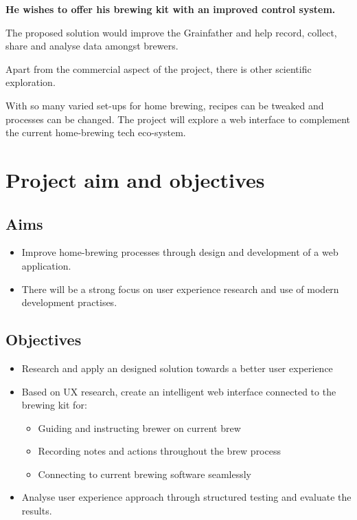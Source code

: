\textbf{He wishes to offer his brewing kit with an improved control system.}

The proposed solution would improve the Grainfather and help record, collect, share and analyse data amongst brewers.

Apart from the commercial aspect of the project, there is other scientific exploration.

With so many varied set-ups for home brewing, recipes can be tweaked and processes can be changed. The project will explore a web interface to complement the current home-brewing tech eco-system.

\section{Project aim and objectives}

    \subsection{Aims}

        \begin{itemize}
            \item Improve home-brewing processes through design and development of a web application.
            \item There will be a strong focus on user experience research and use of modern development practises.
        \end{itemize}

    \subsection{Objectives}

        \begin{itemize}
            \item Research and apply an designed solution towards a better user experience
            \item Based on UX research, create an intelligent web interface connected to the brewing kit for:
                \begin{itemize}
                    \item Guiding and instructing brewer on current brew
                    \item Recording notes and actions throughout the brew process
                    \item Connecting to current brewing software seamlessly
                \end{itemize}
            \item Analyse user experience approach through structured testing and evaluate the results.
        \end{itemize}

